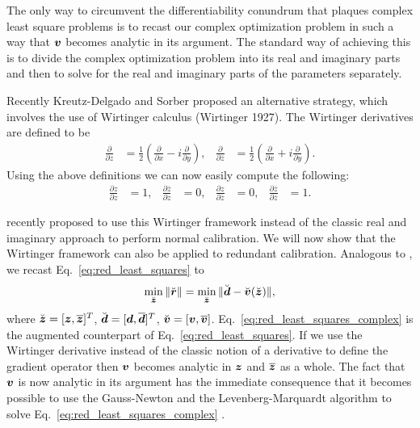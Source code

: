 \documentclass[useAMS,usenatbib]{mn2e}
\newcommand{\bz}{\bmath{z}}
\newcommand{\br}{\bmath{r}}
\newcommand{\bd}{\bmath{d}}
\newcommand{\bv}{\bmath{v}}
\newcommand{\conj}[1]{\overline{#1}}
\begin{document}
The only way to circumvent the differentiability conundrum that plaques complex least square problems is to recast our complex optimization problem in such a way that $\bv$ becomes analytic in its argument.
The standard way of achieving this is to divide the complex optimization problem into its real and imaginary parts and then to solve for the real and imaginary parts of the parameters separately.

Recently Kreutz-Delgado and Sorber proposed an alternative strategy, which involves the use of Wirtinger calculus (Wirtinger 1927). The Wirtinger derivatives 
are defined to be 
\begin{align}
\frac{\partial}{\partial z} &= \frac{1}{2}\left ( \frac{\partial}{\partial x} -  i \frac{\partial}{\partial y} \right ),&\frac{\partial}{\partial \conj{z}} &= \frac{1}{2}\left ( \frac{\partial}{\partial x} +  i \frac{\partial}{\partial y} \right ). 
\end{align}
Using the above definitions we can now easily compute the following:
\begin{align}
\frac{\partial z}{\partial z} & = 1, & \frac{\partial \conj{z}}{\partial z}&=0, & \frac{\partial z}{\partial \conj{z}} & = 0, & \frac{\partial \conj{z}}{\partial \conj{z}}&=1.
\end{align}

\citet{Smirnov2015} recently proposed to use this Wirtinger framework instead of the classic real and imaginary approach to perform normal calibration. We will now show
that the Wirtinger framework can also be applied to redundant calibration. Analogous to \cite{Smirnov2015}, we recast Eq.~\eqref{eq:red_least_squares} to 
\begin{equation}
\label{eq:red_least_squares_complex}
\min_{\breve{\bz}} \|\breve{\br}\| = \min_{\breve{\bz}} \|\breve{\bd} - \breve{\bv}(\breve{\bz})\|, 
\end{equation}
where $\breve{\bz} = [\bz,\conj{\bz}]^T$, $\breve{\bd} = [\bd,\conj{\bd}]^T$, $\breve{\bv} = [\bv,\conj{\bv}]$. Eq.~\eqref{eq:red_least_squares_complex} is the augmented counterpart of Eq.~\eqref{eq:red_least_squares}.
If we use the Wirtinger derivative instead of the classic notion of a derivative to define the gradient operator then 
$\bv$ becomes analytic in $\bz$ and $\conj{\bz}$ as a whole. The fact that $\bv$ is now analytic in its argument has the immediate consequence that it becomes possible to use the Gauss-Newton
and the Levenberg-Marquardt algorithm to solve Eq.~\eqref{eq:red_least_squares_complex} \citep{Smirnov2015}.
\end{document}
